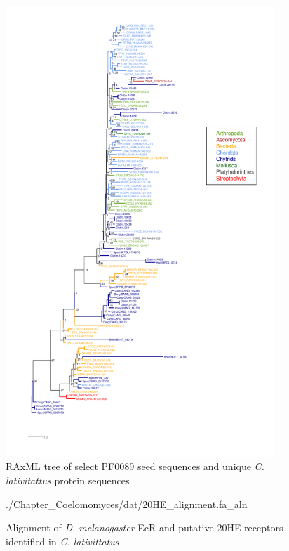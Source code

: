 \begin{figure}[htbp]
  \includegraphics[width=4in]{./Chapter_Coelomomyces/img/PF00089_tree.png}
  \caption[PF00089 RAxML tree]{RAxML tree of select PF0089 seed sequences and unique \textit{C. lativitattus} protein sequences}
  \label{fig:ChClat_PF00089}
\end{figure}

\begin{figure}[tbp]
  \begin{texshade}{./Chapter_Coelomomyces/dat/20HE_alignment.fa_aln}
  \end{texshade}
  \caption[20HE alignment]{Alignment of \textit{D. melanogaster} EcR and putative 20HE receptors identified in \textit{C. lativittatus} }
  \label{fig:ChClat_20HEalign}
\end{figure}

